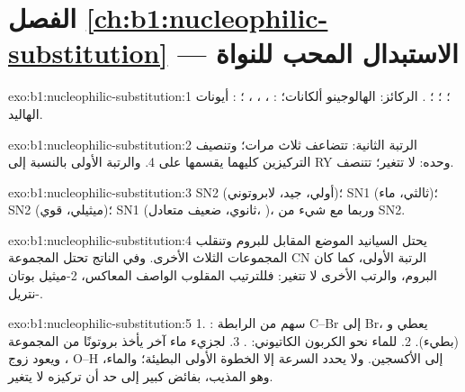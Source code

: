 \section*{الفصل \ref{ch:b1:nucleophilic-substitution} --- الاستبدال المحب للنواة}

\begin{solution}{exo:b1:nucleophilic-substitution:1}
؛ ؛ ؛
. الركائز: الهالوجينو ألكانات؛ :
، ، ، ؛ : أيونات الهاليد.
\end{solution}

\begin{solution}{exo:b1:nucleophilic-substitution:2}
الرتبة الثانية: تتضاعف ثلاث مرات؛ وتنصيف التركيزين كليهما يقسمها على 4. والرتبة الأولى بالنسبة إلى RY وحده:
لا تتغير؛ تتنصف.
\end{solution}

\begin{solution}{exo:b1:nucleophilic-substitution:3}
SN2 (أولي،  جيد، لابروتوني)؛ SN1 (ثالثي، ماء)؛ SN2
(ميثيلي،  قوي)؛  SN1 (ثانوي،  ضعيف
متعادل، )، وربما مع شيء من SN2.
\end{solution}

\begin{solution}{exo:b1:nucleophilic-substitution:4}
يحتل السيانيد الموضع المقابل للبروم وتنقلب المجموعات الثلاث
الأخرى. وفي الناتج تحتل المجموعة CN الرتبة الأولى، كما كان البروم،
والرتب الأخرى لا تتغير: فللترتيب المقلوب الواصف
المعاكس، 2-ميثيل بوتان نتريل-.
\end{solution}

\begin{solution}{exo:b1:nucleophilic-substitution:5}
1. : سهم من الرابطة C--Br إلى Br، يعطي 
و (بطيء). 2.  للماء نحو الكربون الكاتيوني:
. 3.  لجزيء ماء آخر يأخذ بروتونًا
من المجموعة ، ويعود زوج O--H إلى الأكسجين. ولا يحدد السرعة إلا الخطوة
الأولى البطيئة؛ والماء، وهو المذيب، بفائض كبير إلى حد أن
تركيزه لا يتغير.
\end{solution}

